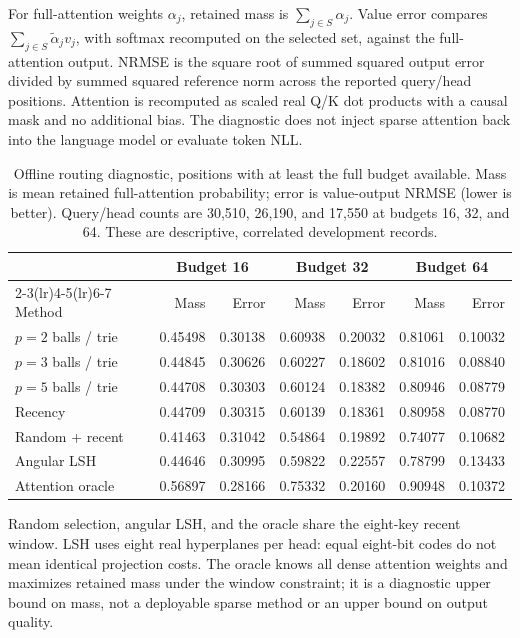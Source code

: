 \documentclass[11pt]{article}
\begin{document}
For full-attention weights \(\alpha_j\), retained mass is
\(\sum_{j\in S}\alpha_j\). Value error compares
\(\sum_{j\in S}\widetilde{\alpha}_j v_j\), with softmax recomputed on the selected
set, against the full-attention output. NRMSE is the square root of summed
squared output error divided by summed squared reference norm across the
reported query/head positions. Attention is recomputed as scaled real Q/K dot
products with a causal mask and no additional bias. The diagnostic does not
inject sparse attention back into the language model or evaluate token NLL.

\begin{table}[htbp]
\centering
\small
\caption{Offline routing diagnostic, positions with at least the full budget
available. Mass is mean retained full-attention probability; error is value-output
NRMSE (lower is better). Query/head counts are 30,510, 26,190, and 17,550 at
budgets 16, 32, and 64. These are descriptive, correlated development records.}
\begin{tabular}{lrrrrrr}
\toprule
 & \multicolumn{2}{c}{Budget 16} & \multicolumn{2}{c}{Budget 32}
 & \multicolumn{2}{c}{Budget 64}\\
\cmidrule(lr){2-3}\cmidrule(lr){4-5}\cmidrule(lr){6-7}
Method & Mass & Error & Mass & Error & Mass & Error\\
\midrule
\(p=2\) balls / trie & 0.45498 & 0.30138 & 0.60938 & 0.20032 & 0.81061 & 0.10032\\
\(p=3\) balls / trie & 0.44845 & 0.30626 & 0.60227 & 0.18602 & 0.81016 & 0.08840\\
\(p=5\) balls / trie & 0.44708 & 0.30303 & 0.60124 & 0.18382 & 0.80946 & 0.08779\\
Recency & 0.44709 & 0.30315 & 0.60139 & 0.18361 & 0.80958 & 0.08770\\
Random + recent & 0.41463 & 0.31042 & 0.54864 & 0.19892 & 0.74077 & 0.10682\\
Angular LSH & 0.44646 & 0.30995 & 0.59822 & 0.22557 & 0.78799 & 0.13433\\
Attention oracle & 0.56897 & 0.28166 & 0.75332 & 0.20160 & 0.90948 & 0.10372\\
\bottomrule
\end{tabular}
\label{tab:routing}
\end{table}

Random selection, angular LSH, and the oracle share the eight-key recent window.
LSH uses eight real hyperplanes per head: equal eight-bit codes do not mean
identical projection costs. The oracle knows all dense attention weights and
maximizes retained mass under the window constraint; it is a diagnostic upper
bound on mass, not a deployable sparse method or an upper bound on output quality.
\end{document}
